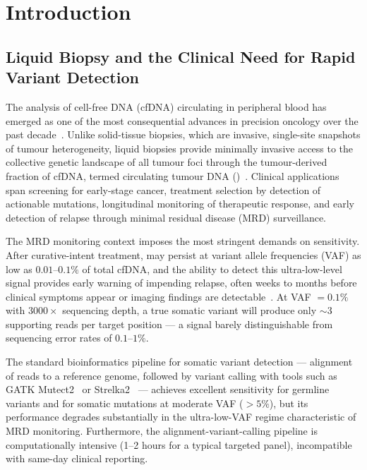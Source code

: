 \section{Introduction}
\label{sec:introduction}

\subsection{Liquid Biopsy and the Clinical Need for Rapid Variant Detection}

The analysis of cell-free DNA (cfDNA) circulating in peripheral blood has
emerged as one of the most consequential advances in precision oncology over the
past decade~\cite{wan2017liquid}.  Unlike solid-tissue biopsies, which are
invasive, single-site snapshots of tumour heterogeneity, liquid biopsies
provide minimally invasive access to the collective genetic landscape of all
tumour foci through the tumour-derived fraction of cfDNA, termed circulating
tumour DNA (\ctDNA{})~\cite{siravegna2017integrating}.  Clinical applications
span screening for early-stage cancer, treatment selection by detection of
actionable mutations, longitudinal monitoring of therapeutic response, and early
detection of relapse through minimal residual disease (MRD) surveillance.

The MRD monitoring context imposes the most stringent demands on sensitivity.
After curative-intent treatment, \ctDNA{} may persist at variant allele
frequencies (VAF) as low as $0.01\text{--}0.1\%$ of total cfDNA, and the
ability to detect this ultra-low-level signal provides early warning of
impending relapse, often weeks to months before clinical symptoms appear or
imaging findings are detectable~\cite{bettegowda2014detection,heitzer2019current}.
At VAF $= 0.1\%$ with $3000\times$ sequencing depth, a true somatic variant
will produce only $\sim$3 supporting reads per target position --- a signal
barely distinguishable from sequencing error rates of $0.1\text{--}1\%$.

The standard bioinformatics pipeline for somatic variant detection --- alignment
of reads to a reference genome, followed by variant calling with tools such as
GATK Mutect2~\cite{cibulskis2013mutect} or Strelka2~\cite{saunders2012strelka}
--- achieves excellent sensitivity for germline variants and for somatic
mutations at moderate VAF ($>5\%$), but its performance degrades substantially
in the ultra-low-VAF regime characteristic of MRD monitoring.  Furthermore, the
alignment-variant-calling pipeline is computationally intensive (1--2 hours for
a typical targeted panel), incompatible with same-day clinical reporting.

